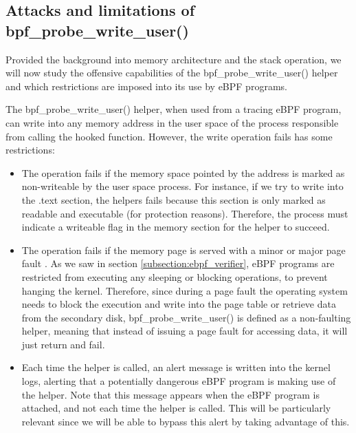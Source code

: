 \subsection{Attacks and limitations of bpf\_probe\_write\_user()} \label{subsection:bpf_probe_write_apps}
Provided the background into memory architecture and the stack operation, we will now study the offensive capabilities of the bpf\_probe\_write\_user() helper and which restrictions are imposed into its use by eBPF programs.

The bpf\_probe\_write\_user() helper, when used from a tracing eBPF program, can write into any memory address in the user space of the process responsible from calling the hooked function. However, the write operation fails has some restrictions:
\begin{itemize}
\item{The operation fails if the memory space pointed by the address is marked as non-writeable by the user space process. For instance, if we try to write into the .text section, the helpers fails because this section is only marked as readable and executable (for protection reasons).} Therefore, the process must indicate a writeable flag in the memory section for the helper to succeed.
\item{The operation fails if the memory page is served with a minor or major page fault \cite{bpf_probe_write_user_errors}. As we saw in section \ref{subsection:ebpf_verifier}, eBPF programs are restricted from executing any sleeping or blocking operations, to prevent hanging the kernel. Therefore, since during a page fault the operating system needs to block the execution and write into the page table or retrieve data from the secondary disk, bpf\_probe\_write\_user() is defined as a non-faulting helper\cite{write_helper_non_fault}, meaning that instead of issuing a page fault for accessing data, it will just return and fail.}
\item{Each time the helper is called, an alert message is written into the kernel logs, alerting that a potentially dangerous eBPF program is making use of the helper. Note that this message appears when the eBPF program is attached, and not each time the helper is called. This will be particularly relevant since we will be able to bypass this alert by taking advantage of this.}
\end{itemize}

